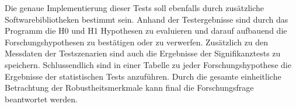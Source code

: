 Die genaue Implementierung dieser Tests soll ebenfalls durch zusätzliche Softwarebibliotheken bestimmt sein.
Anhand der Testergebnisse sind durch das Programm die H0 und H1 Hypothesen zu evaluieren und darauf aufbauend die Forschungshypothesen zu bestätigen oder zu verwerfen.
Zusätzlich zu den Messdaten der Testszenarien sind auch die Ergebnisse der Signifikanztests zu speichern.
Schlussendlich sind in einer Tabelle zu jeder Forschungshypothese die Ergebnisse der statistischen Tests anzuführen.
Durch die gesamte einheitliche Betrachtung der Robustheitsmerkmale kann final die Forschungsfrage beantwortet werden.

